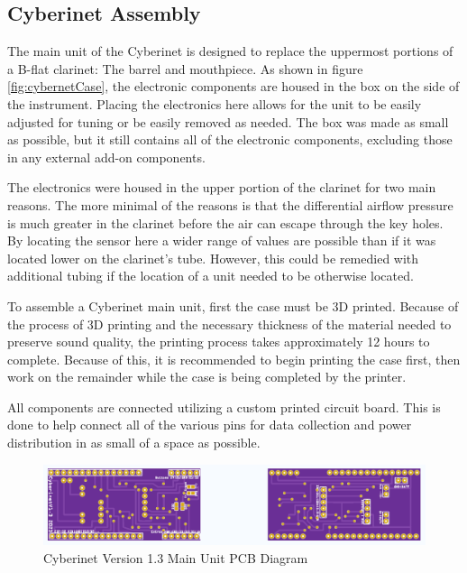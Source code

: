 \subsection{Cyberinet Assembly}

The main unit of the Cyberinet is designed to replace the uppermost portions of a B-flat clarinet: The barrel and mouthpiece. As shown in figure \ref{fig:cybernetCase}, the electronic components are housed in the box on the side of the instrument. Placing the electronics here allows for the unit to be easily adjusted for tuning or be easily removed as needed. The box was made as small as possible, but it still contains all of the electronic components, excluding those in any external add-on components. 

The electronics were housed in the upper portion of the clarinet for two main reasons. The more minimal of the reasons is that the differential airflow pressure is much greater in the clarinet before the air can escape through the key holes. By locating the sensor here a wider range of values are possible than if it was located lower on the clarinet's tube. However, this could be remedied with additional tubing if the location of a unit needed to be otherwise located.

To assemble a Cyberinet main unit, first the case must be 3D printed. Because of the process of 3D printing and the necessary thickness of the material needed to preserve sound quality, the printing process takes approximately 12 hours to complete. Because of this, it is recommended to begin printing the case first, then work on the remainder while the case is being completed by the printer.

All components are connected utilizing a custom printed circuit board. This is done to help connect all of the various pins for data collection and power distribution in as small of a space as possible. 

\begin{center}
    \begin{figure}
        \centering
        \includegraphics[scale=0.6]{diagrams/PCBs/cyberinetPCB.png}
        \caption{Cyberinet Version 1.3  Main Unit PCB Diagram}
        \label{fig:mainUnitPCB}
    \end{figure}
\end{center}

